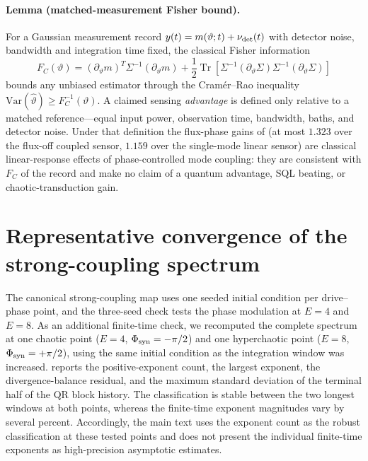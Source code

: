 \documentclass[aip,cha,reprint]{revtex4-2}
\begin{document}
\paragraph{Lemma (matched-measurement Fisher bound).}
For a Gaussian measurement record $y(t)=m(\vartheta;t)+\nu_{\rm det}(t)$ with
detector noise, bandwidth and integration time fixed, the classical Fisher
information
\begin{equation}
 F_C(\vartheta)=(\partial_\vartheta m)^T\Sigma^{-1}(\partial_\vartheta m)
 +\frac12\operatorname{Tr}\!\left[\Sigma^{-1}(\partial_\vartheta\Sigma)
 \Sigma^{-1}(\partial_\vartheta\Sigma)\right]
\label{eq:fisher-lemma}
\end{equation}
bounds any unbiased estimator through the Cram\'er--Rao inequality~\cite{clerk2010,braunstein1994}
$\mathrm{Var}(\hat\vartheta)\ge F_C^{-1}(\vartheta)$. A claimed sensing
\emph{advantage} is defined only relative to a matched reference---equal input
power, observation time, bandwidth, baths, and detector noise. Under that
definition the flux-phase gains of  (at most
$\num{1.323}$ over the flux-off coupled sensor, $\num{1.159}$ over the
single-mode linear sensor) are classical linear-response effects of
phase-controlled mode coupling: they are consistent with $F_C$ of the record
and make no claim of a quantum advantage, SQL beating, or
chaotic-transduction gain.

\section{Representative convergence of the strong-coupling spectrum}

The canonical strong-coupling map uses one seeded initial condition per drive--phase
point, and the three-seed check tests the phase modulation at $E=4$ and $E=8$.
As an additional finite-time check, we recomputed the complete spectrum at one
chaotic point ($E=4$, $\Phi_{\rm syn}=-\pi/2$) and one hyperchaotic point
($E=8$, $\Phi_{\rm syn}=+\pi/2$), using the same initial condition as the
integration window was increased.  reports the
positive-exponent count, the largest exponent, the divergence-balance residual, and
the maximum standard deviation of the terminal half of the QR block history. The
classification is stable between the two longest windows at both points, whereas
the finite-time exponent magnitudes vary by several percent. Accordingly, the
main text uses the exponent count as the robust classification at these tested
points and does not present the individual finite-time exponents as high-precision
asymptotic estimates.
\end{document}
